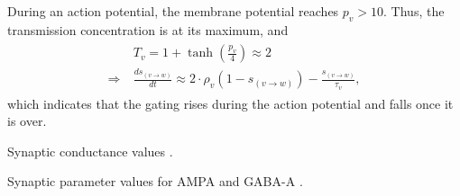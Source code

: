 During an action potential, the membrane potential reaches $p_v > 10$. Thus, the transmission concentration is at its maximum, and
\begin{gather}
\begin{split}
    & T_v = 1 + \tanh \left( \frac{p_{v}}{4} \right) \approx 2 \\
    \Rightarrow \ & \frac{ds_{(v \to w)}}{dt} \approx 2 \cdot \rho_v (1 - s_{(v \to w)}) - \frac{s_{(v \to w)}}{\tau_{v}},
\end{split}
\end{gather}
which indicates that the gating rises during the action potential and falls once it is over. 

\begin{table}[!htp] 
    \centering
    
    \caption{Synaptic conductance values \cite{Lowet2015}.}
    \label{tab:conductance-synaptic}
\end{table}

\begin{table}[!htp] 
    \centering
    
    \caption{Synaptic parameter values for AMPA and GABA-A \cite{Lowet2015}.}
    \label{tab:synaptic-current-params}
\end{table}


